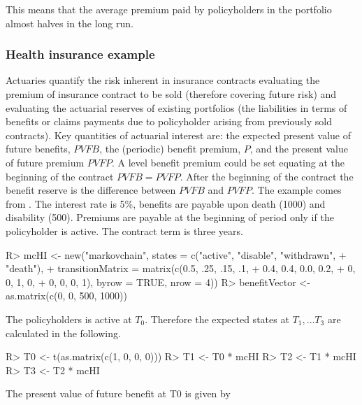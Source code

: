 \documentclass[nojss]{jss}
\begin{document}
This means that the average premium paid by policyholders in the portfolio
almost halves in the long run.

\subsubsection{Health insurance example}\label{sec:hi}
Actuaries quantify the risk inherent in insurance contracts evaluating the premium of insurance contract to be sold (therefore covering future risk) and evaluating the actuarial reserves of existing portfolios (the liabilities in terms of benefits or claims payments due to policyholder arising from previously sold contracts).
Key quantities of actuarial interest are: the expected present value of future benefits, $PVFB$, the (periodic) benefit premium, $P$, and the present value of future premium $PVFP$. A level benefit premium could be set equating at the beginning of the contract $PVFB=PVFP$. After the beginning of the contract the benefit reserve is the difference between $PVFB$ and $PVFP$.
The example comes from \cite{deshmukh2012multiple}. The interest rate is 5\%, 
benefits are payable upon death (1000) and disability (500). Premiums are 
payable at the beginning of period only if the policyholder is active. The contract term is three years.

\begin{Schunk}
\begin{Sinput}
R> mcHI <- new("markovchain", states = c("active", "disable", "withdrawn", 
+                                        "death"),
+           transitionMatrix = matrix(c(0.5, .25, .15, .1,
+                                     0.4, 0.4, 0.0, 0.2,
+                                     0, 0, 1, 0,
+                                     0, 0, 0, 1), byrow = TRUE, nrow = 4))
R> benefitVector <- as.matrix(c(0, 0, 500, 1000))
\end{Sinput}
\end{Schunk}

The policyholders is active at $T_0$. Therefore the expected states at $T_1, \ldots T_3$ are calculated in the following.

\begin{Schunk}
\begin{Sinput}
R> T0 <- t(as.matrix(c(1, 0, 0, 0)))
R> T1 <- T0 * mcHI
R> T2 <- T1 * mcHI
R> T3 <- T2 * mcHI
\end{Sinput}
\end{Schunk}

The present value of future benefit at T0 is given by
\end{document}
